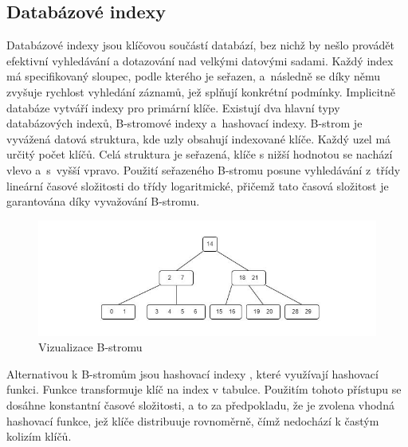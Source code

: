\subsection{Databázové indexy}
Databázové indexy \cite{databaseIndexIbm, databaseIndexJimmy, databaseIndexRimon} jsou klíčovou součástí databází, bez nichž by nešlo provádět efektivní vyhledávání a dotazování nad velkými datovými sadami. Každý index má specifikovaný sloupec, podle kterého je seřazen, a~následně se díky němu zvyšuje rychlost vyhledání záznamů, jež splňují konkrétní podmínky. Implicitně databáze vytváří indexy pro primární klíče.
\newpara
Existují dva hlavní typy databázových indexů, B-stromové indexy a~hashovací indexy. B\mbox{-strom} je vyvážená datová struktura, kde uzly obsahují indexované klíče. Každý uzel má určitý počet klíčů. Celá struktura je seřazená, klíče s nižší hodnotou se nachází vlevo a~s~vyšší vpravo. Použití seřazeného B-stromu posune vyhledávání z~třídy lineární časové složitosti do třídy logaritmické, přičemž tato časová složitost je garantována díky vyvažování B-stromu.

\begin{figure}[htbp]
    \centering
        \includegraphics[scale=.6]{obrazky-figures/implementation/b_trees.jpg}
        \caption{Vizualizace B-stromu\protect\footnotemark}
\end{figure}



\newpage
\noindent
Alternativou k B\mbox{-stromům} jsou hashovací indexy \cite{hashTableYourBasic}, které využívají hashovací funkci. Funkce transformuje klíč na index v tabulce. Použitím tohoto přístupu se dosáhne konstantní časové složitosti, a to za předpokladu, že je zvolena vhodná hashovací funkce, jež klíče distribuuje rovnoměrně, čímž nedochází k častým kolizím klíčů. 

